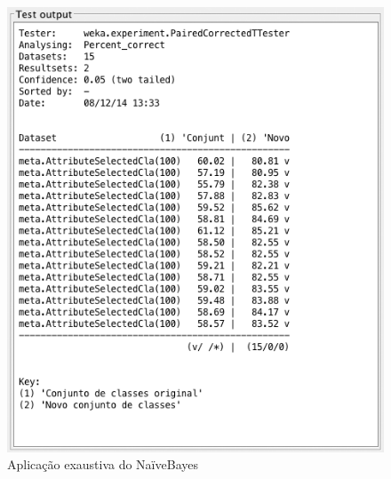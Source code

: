 \begin{figure}[p]
	\centering
	\includegraphics[width=\textwidth]{figs/geral/exaustive-naivebayes.png}
	\caption{\label{fig_6}Aplicação exaustiva do NaïveBayes}
\end{figure}
